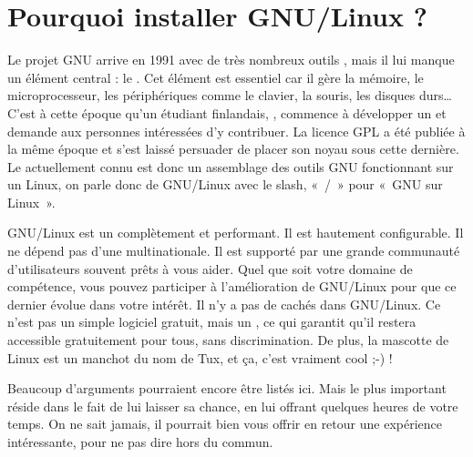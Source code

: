 \section{Pourquoi installer GNU/Linux ?}
Le projet GNU arrive en 1991 avec de très nombreux outils , mais il lui manque un élément central : le . Cet élément est essentiel car il gère la mémoire, le microprocesseur, les périphériques comme le clavier, la souris, les disques durs\ldots{}\\
C'est à cette époque qu'un étudiant finlandais, , commence à développer un  et demande aux personnes intéressées d'y contribuer. La licence GPL a été publiée à la même époque et  s'est laissé persuader de placer son noyau sous cette dernière. Le  actuellement connu est donc un assemblage des outils GNU fonctionnant sur un  Linux, on parle donc de GNU/Linux avec le slash, «~/~» pour «~GNU sur Linux~».\par
GNU/Linux est un  complètement  et performant. Il est hautement configurable. Il ne dépend pas d'une multinationale. Il est supporté par une grande communauté d'utilisateurs souvent prêts à vous aider. Quel que soit votre domaine de compétence, vous pouvez participer à l'amélioration de GNU/Linux pour que ce dernier évolue dans votre intérêt. Il n'y a pas de  cachés dans GNU/Linux. Ce n'est pas un simple logiciel gratuit, mais un , ce qui garantit qu'il restera accessible gratuitement pour tous, sans discrimination. De plus, la mascotte de Linux est un manchot du nom de Tux, et ça, c'est vraiment cool ;-) !\par
Beaucoup d'arguments pourraient encore être listés ici. Mais le plus important réside dans le fait de lui laisser sa chance, en lui offrant quelques heures de votre temps. On ne sait jamais, il pourrait bien vous offrir en retour une expérience intéressante, pour ne pas dire hors du commun.\par
